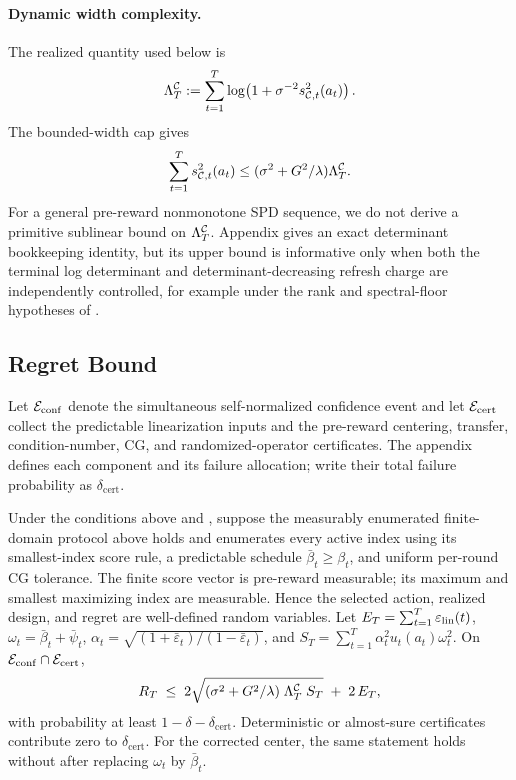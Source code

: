 \paragraph{Dynamic width complexity.}
The realized quantity used below is
\begin{equation}\label{eq:main-lambda}
 \Lambda^{\mathcal{C}}_T:=\sum_{t=1}^T\log\!\left(1+\sigma^{-2}s_{\mathcal{C},t}^2(a_t)\right).
\end{equation}
The bounded-width cap gives
\begin{equation}\label{eq:main-dynamic}
 \sum_{t=1}^T s_{\mathcal{C},t}^2(a_t)
 \le(\sigma^2+G^2/\lambda)\Lambda^{\mathcal{C}}_T.
\end{equation}
For a general pre-reward nonmonotone SPD sequence, we do not derive a
primitive sublinear bound on $\Lambda^{\mathcal{C}}_T$.  Appendix
 gives an exact determinant bookkeeping identity,
but its upper bound is informative only when both the terminal log determinant
and determinant-decreasing refresh charge are independently controlled, for
example under the rank and spectral-floor hypotheses of
.

\subsection{Regret Bound}

Let $\mathcal{E}_{\mathrm{conf}}$ denote the simultaneous self-normalized confidence
event and let $\mathcal{E}_{\mathrm{cert}}$ collect the predictable linearization inputs
and the pre-reward centering, transfer, condition-number, CG, and
randomized-operator certificates.
The appendix defines each component and its failure allocation; write their
total failure probability as $\delta_{\mathrm{cert}}$.

\begin{theorem}\label{thm:regret}
Under the conditions above and ,
suppose the measurably enumerated finite-domain protocol above holds and
 enumerates every active index using its smallest-index score
rule, a predictable schedule $\bar\beta_t\ge\beta_t$, and uniform per-round CG
tolerance.  The finite score vector is pre-reward measurable; its maximum and
smallest maximizing index are measurable.  Hence the selected action, realized
design, and regret are well-defined random variables.  Let
$E_T=\sum_{t=1}^T\varepsilon_{\mathrm{lin}}(t)$, $\omega_t=\bar\beta_t+\bar\psi_t$,
$\alpha_t=\sqrt{(1+\bar\varepsilon_t)/(1-\bar\varepsilon_t)}$, and
$S_T=\sum_{t=1}^T\alpha_t^2u_t(a_t)\omega_t^2$.  On
$\mathcal{E}_{\mathrm{conf}}\cap\mathcal{E}_{\mathrm{cert}}$,
\begin{equation}\label{eq:regret-bound}
  R_T
  \;\le\;
  2\sqrt{(\sigma^2 + G^2/\lambda)\;\Lambda^{\mathcal{C}}_T\;S_T}
  \;+\; 2\,E_T,
\end{equation}
with probability at least $1-\delta-\delta_{\mathrm{cert}}$.  Deterministic or
almost-sure certificates contribute zero to $\delta_{\mathrm{cert}}$.  For the
corrected center, the same statement holds without  after
replacing $\omega_t$ by $\bar\beta_t$.
\end{theorem}

